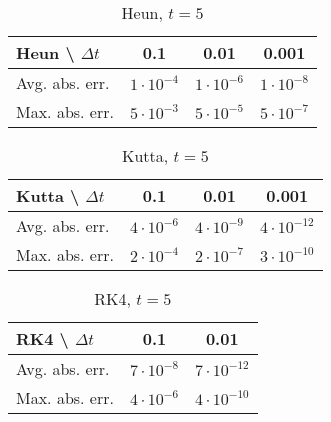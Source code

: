 \begin{table}[h]
  \caption{Heun, $t = 5$}
  \label{tab:heun-lyapunov-error-rk4-ref}
  \centering
  \begin{tabular}[h]{l|c|c|c}
    \hline
    Heun \textbackslash\hspace{0.5em} $\Delta{t}$& 0.1 & 0.01 & 0.001 \\
    \hline
    Avg. abs. err. & $1 \cdot 10^{-4}$ & $1 \cdot 10^{-6} $ & $1 \cdot 10^{-8}$ \\
    Max. abs. err. & $5 \cdot 10^{-3}$ & $5 \cdot 10^{-5}$ & $5 \cdot 10^{-7} $ \\
    \hline
  \end{tabular}
\end{table}

\begin{table}[h]
  \caption{Kutta, $t = 5$}
  \label{tab:kutta-lyapunov-error-rk4-ref}
  \centering
  \begin{tabular}[h]{l|c|c|c}
    \hline
    Kutta \textbackslash\hspace{0.5em} $\Delta{t}$& 0.1 & 0.01 & 0.001 \\
    \hline
    Avg. abs. err. & $4 \cdot 10^{-6}$ & $4 \cdot 10^{-9} $ & $4 \cdot 10^{-12}$ \\
    Max. abs. err. & $2 \cdot 10^{-4}$ & $2 \cdot 10^{-7}$ & $3 \cdot 10^{-10} $ \\
    \hline
  \end{tabular}
\end{table}

\begin{table}[h]
  \caption{RK4, $t = 5$}
  \label{tab:RK4-lyapunov-error-rk4-ref}
  \centering
  \begin{tabular}[h]{l|c|c}
    \hline
    RK4 \textbackslash\hspace{0.5em} $\Delta{t}$& 0.1 & 0.01 \\
    \hline
    Avg. abs. err. & $7 \cdot 10^{-8}$ & $7 \cdot 10^{-12} $ \\
    Max. abs. err. & $4 \cdot 10^{-6}$ & $4 \cdot 10^{-10}$ \\
    \hline
  \end{tabular}
\end{table}




